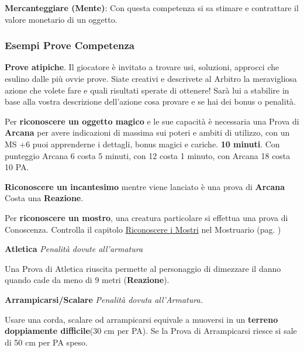 \documentclass[12pt,a4paper,twoside,openany]{book}
\begin{document}
\begin{multicols}{2}
\textbf{Mercanteggiare (Mente)}: Con questa competenza si sa stimare e contrattare il valore monetario di un oggetto.

\subsubsection{Esempi Prove Competenza}\label{esempiprovecompetenza}\hypertarget{esempiprovecompetenze}{}

\textbf{Prove atipiche}. Il giocatore è invitato a trovare usi, soluzioni, approcci che esulino dalle più ovvie prove. Siate creativi e descrivete al Arbitro la meravigliosa azione che volete fare e quali risultati sperate di ottenere! Sarà lui a stabilire in base alla vostra descrizione dell'azione cosa provare e se hai dei bonus o penalità.

\medskip

Per \textbf{riconoscere un oggetto magico} e le sue capacità è necessaria una Prova di \textbf{Arcana} per avere indicazioni di massima sui poteri e ambiti di utilizzo, con un MS +6 puoi apprenderne i dettagli, bonus magici e cariche. \textbf{10 minuti}. Con punteggio Arcana 6 costa 5 minuti, con 12 costa 1 minuto, con Arcana 18 costa 10 PA.

\medskip

\textbf{Riconoscere un incantesimo} mentre viene lanciato è una prova di \textbf{Arcana} Costa una \textbf{Reazione}.
\medskip

Per \textbf{riconoscere un mostro}, una creatura particolare si effettua una prova di Conoscenza. Controlla il capitolo \hyperlink{riconoscereimostri}{Riconoscere i Mostri} nel Mostruario (pag. \pageref{riconoscereimostri})

\medskip

\textbf{Atletica} \textit{Penalità dovute all'armatura}

Una Prova di Atletica riuscita permette al personaggio di dimezzare il danno quando cade da meno di 9 metri (\textbf{Reazione}).

\medskip

\textbf{Arrampicarsi/Scalare}  \textit{Penalità dovuta all'Armatura.}

\medskip

Usare una corda, scalare od arrampicarsi equivale a muoversi in un \textbf{terreno doppiamente difficile}(30 cm per PA). Se la Prova di Arrampicarsi riesce si sale di 50 cm per PA speso.


\end{multicols}
\end{document}
